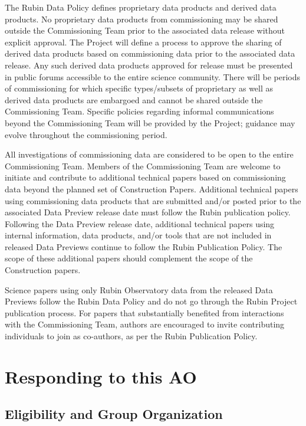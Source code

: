 \documentclass[SE,authoryear,toc,lsstdraft]{lsstdoc}
\begin{document}
The Rubin Data Policy  defines proprietary data products and derived data products. No proprietary data products from commissioning may be shared outside the Commissioning Team prior to the associated data release without explicit approval. The Project will define a process to approve the sharing of derived data products based on commissioning data prior to the associated data release. Any such derived data products approved for release must be presented in public forums accessible to the entire science community. There will be periods of commissioning for which specific types/subsets of proprietary as well as derived data products are embargoed and cannot be shared outside the Commissioning Team. Specific policies regarding informal communications beyond the Commissioning Team will be provided by the Project; guidance may evolve throughout the commissioning period. 

All investigations of commissioning data are considered to be open to the entire Commissioning Team. Members of the Commissioning Team are welcome to initiate and contribute to additional technical papers based on commissioning data beyond the planned set of Construction Papers. Additional technical papers using commissioning data products that are submitted and/or posted prior to the associated Data Preview release date must follow the Rubin publication policy. Following the Data Preview release date, additional technical papers using internal information, data products, and/or tools that are not included in released Data Previews continue to follow the Rubin Publication Policy. The scope of these additional papers should complement the scope of the Construction papers.

Science papers using only Rubin Observatory data from the released Data Previews follow the Rubin Data Policy  and do not go through the Rubin Project publication process. For papers that substantially benefited from interactions with the Commissioning Team, authors are encouraged to invite contributing individuals to join as co-authors, as per the Rubin Publication Policy.

\section{Responding to this AO}
\label{loi}

\subsection{Eligibility and Group Organization}
\label{eligibility}
\end{document}
